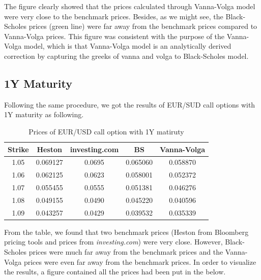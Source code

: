 \noindent
The figure clearly showed that the prices calculated through Vanna-Volga model were very close to the benchmark prices. Besides, as we might see, the Black-Scholes prices (green line) were far away from the benchmark prices compared to Vanna-Volga prices. This figure was consistent with the purpose of the Vanna-Volga model, which is that Vanna-Volga model is an analytically derived correction by capturing the greeks of vanna and volga to Black-Scholes model.

\subsection{1Y Maturity}

Following the same procedure, we got the results of EUR/SUD call options with 1Y maturity as following.

\begin{table}[htb]
	\centering
	\caption{Prices of EUR/USD call option with 1Y matiruty}
	\begin{tabular}{ccccc}
		\hline \hline
		Strike & Heston & investing.com & BS & Vanna-Volga \\ [0.5ex]
		\hline
		1.05 &	0.069127&	0.0695&	0.065060&	0.058870 \\ 
		1.06&	0.062125&	0.0623	&0.058001&	0.052372\\
		1.07&	0.055455&	0.0555&	0.051381&	0.046276 \\
		1.08&	0.049155&	0.0490	&0.045220&	0.040596\\
		1.09&	0.043257&	0.0429	&0.039532&	0.035339 \\ [0.5ex]
		\hline
	\end{tabular}
	\label{table:prices-1Y}
\end{table}
\noindent
From the table, we found that two benchmark prices (Heston from Bloomberg pricing tools and prices from \textit{investing.com}) were very close. However, Black-Scholes prices were much far away from the benchmark prices and the Vanna-Volga prices were even far away from the benchmark prices. In order to visualize the results, a figure contained all the prices had been put in the below.

